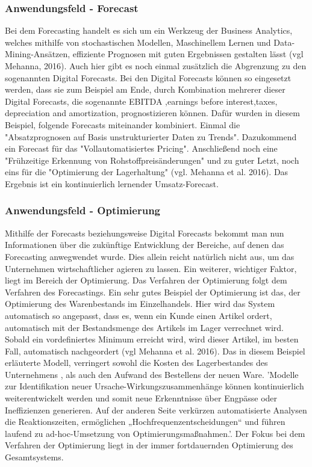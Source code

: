 \documentclass[12pt,twocolumn,twoside]{conference}   %
\begin{document}
\subsubsection{Anwendungsfeld - Forecast}
Bei dem Forecasting handelt es sich um ein Werkzeug der Business Analytics, welches mithilfe von stochastischen Modellen, Maschinellem Lernen und Data-Mining-Ansätzen, effiziente Prognosen mit guten Ergebnissen gestalten lässt (vgl Mehanna, 2016). Auch hier gibt es noch einmal zusätzlich die Abgrenzung zu den sogenannten Digital Forecasts. Bei den Digital Forecasts können so eingesetzt werden, dass sie zum Beispiel am Ende, durch Kombination mehrerer dieser Digital Forecasts, die sogenannte EBITDA ,earnings before interest,taxes, depreciation and amortization, prognostizieren können. Dafür wurden in diesem Beispiel, folgende Forecasts miteinander kombiniert. Einmal die "Absatzprognosen auf Basis unstrukturierter Daten zu Trends". Dazukommend ein Forecast für das "Vollautomatisiertes Pricing". Anschließend noch eine "Frühzeitige Erkennung von Rohstoffpreisänderungen" und zu guter Letzt, noch eins für die "Optimierung der Lagerhaltung" (vgl. Mehanna et al. 2016). Das Ergebnis ist ein kontinuierlich lernender Umsatz-Forecast. 

\subsubsection{Anwendungsfeld - Optimierung}
Mithilfe der Forecasts beziehungsweise Digital Forecasts bekommt man nun Informationen über die zukünftige Entwicklung der Bereiche, auf denen das Forecasting anwegwendet wurde. Dies allein reicht natürlich nicht aus, um das  Unternehmen wirtschaftlicher agieren zu lassen. Ein weiterer, wichtiger Faktor, liegt im Bereich der Optimierung. Das Verfahren der Optimierung folgt dem Verfahren des Forecastings. Ein sehr gutes Beispiel der Optimierung ist das, der Optimierung des Warenbestands im Einzelhandels. Hier wird das System automatisch so angepasst, dass es, wenn ein Kunde einen Artikel ordert, automatisch mit der Bestandsmenge des Artikels im Lager verrechnet wird. Sobald ein vordefiniertes Minimum erreicht wird, wird dieser Artikel, im besten Fall, automatisch nachgeordert (vgl Mehanna et al. 2016). Das in diesem Beispiel erläuterte Modell, verringert sowohl die Kosten des Lagerbestandes des Unternehmens , als auch den Aufwand des Bestellens der neuen Ware. 'Modelle zur Identifikation neuer Ursache-Wirkungszusammenhänge können kontinuierlich weiterentwickelt werden und somit neue Erkenntnisse über Engpässe oder Ineffizienzen generieren. Auf der anderen Seite verkürzen automatisierte Analysen die Reaktionszeiten, ermöglichen „Hochfrequenzentscheidungen“ und führen laufend zu ad-hoc-Umsetzung von Optimierungsmaßnahmen.'\cite{PAPER2}. Der Fokus bei dem Verfahren der Optimierung liegt in der immer fortdauernden Optimierung des Gesamtsystems.
\end{document}
